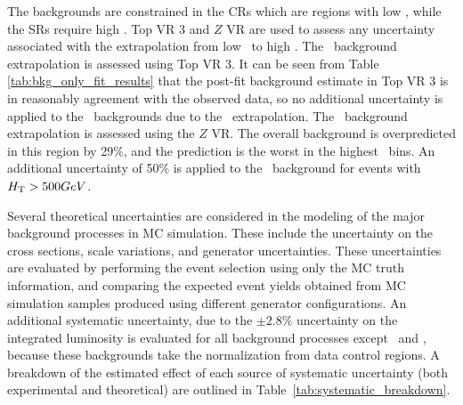 The backgrounds are constrained in the CRs which are regions with low \HT,
while the SRs require high \HT.
Top VR 3 and $Z$ VR are used to assess any uncertainty associated with the
extrapolation from low \HT\ to high \HT.
The \TTBAR\ background extrapolation is assessed using Top VR 3. It can be seen
from Table \ref{tab:bkg_only_fit_results} that the post-fit background estimate
in Top VR 3 is in reasonably agreement with the observed data, so no additional
uncertainty is applied to the \TTBAR\ backgrounds due to the \HT\ extrapolation.
The \ZGAMMAJETS\ background extrapolation is assessed using the $Z$ VR.
The overall background is overpredicted in this region by 29\%, and the
prediction is the worst in the highest \HT\ bins.
An additional uncertainty of 50\% is applied to the \ZGAMMAJETS\ background
for events with $H_{\mathrm{T}} > 500 GeV$.

Several theoretical uncertainties are considered in the modeling of the major
background processes in MC simulation.
These include the uncertainty on the cross sections, scale variations, and
generator uncertainties.
These uncertainties are evaluated by performing the event selection using only
the MC truth information, and comparing the expected event yields obtained
from MC simulation samples produced using different generator configurations.
An additional systematic uncertainty, due to the $\pm 2.8$\% uncertainty on the
integrated luminosity is evaluated for all background processes except
\TTBAR\ and \ZGAMMAJETS, because these backgrounds take the normalization from
data control regions.
A breakdown of the estimated effect of each source of systematic uncertainty
(both experimental and theoretical) are outlined in
Table~\ref{tab:systematic_breakdown}.


